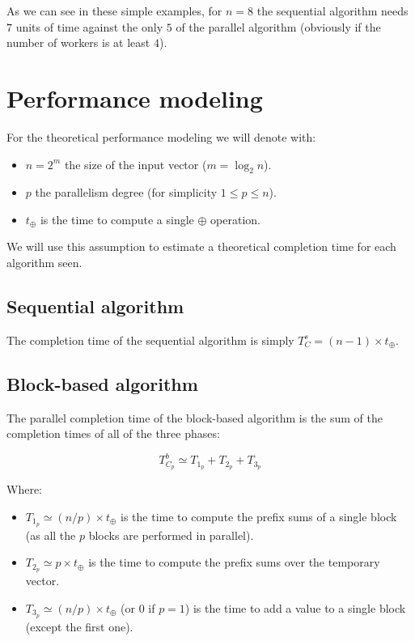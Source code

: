 \documentclass{article}
\begin{document}
As we can see in these simple examples, for $n = 8$ the sequential algorithm needs $7$ units of time against the only $5$ of the parallel algorithm (obviously if the number of workers is at least $4$). 

\section{Performance modeling}

For the theoretical performance modeling we will denote with:

\begin{itemize}
  \item $n = 2^m$ the size of the input vector ($m = \log_2{n}$).
  \item $p$ the parallelism degree (for simplicity $1 \leq p \leq n$).
  \item $t_{\oplus}$ is the time to compute a single $\oplus$ operation.
\end{itemize} 

We will use this assumption to estimate a theoretical completion time for each algorithm seen.

\subsection{Sequential algorithm}

The completion time of the sequential algorithm is simply $T^{s}_C = (n-1) \times t_{\oplus}$. 

\subsection{Block-based algorithm}

The parallel completion time of the block-based algorithm is the sum of the completion times of all of the three phases:

\begin{equation*}
  T^{b}_{C_p} \simeq T_{1_p} + T_{2_p} + T_{3_p}
\end{equation*} 

Where:

\begin{itemize}
  \item $T_{1_p} \simeq (n/p) \times t_{\oplus}$ is the time to compute the prefix sums of a single block (as all the $p$ blocks are performed in parallel).
  \item $T_{2_p} \simeq p \times t_{\oplus}$ is the time to compute the prefix sums over the temporary vector.
  \item $T_{3_p} \simeq (n/p) \times t_{\oplus}$ (or $0$ if $p = 1$) is the time to add a value to a single block (except the first one).
\end{itemize}
\end{document}
